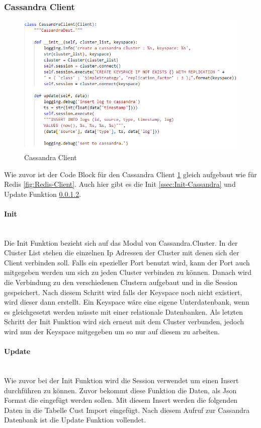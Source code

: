 \subsubsection{Cassandra Client}
\begin{figure}[H]
\centering
  \includegraphics[scale=0.65]{images/CassandraClient.PNG}
  \caption[Cassandra Client]{Cassandra Client}
  \label{fig:Cassandra-Client}
\end{figure}
Wie zuvor ist der Code Block für den Cassandra Client \ref{fig:Cassandra-Client} gleich aufgebaut wie  für Redis \ref{fig:Redis-Client}. Auch hier gibt es die Init \ref{ssec:Init-Cassandra} und Update Funktion \ref{ssec:Update-Cassandra}.
\paragraph{Init}\mbox{}\label{ssec:Init-Cassandra} \\
Die Init Funktion bezieht sich auf das Modul von Cassandra.Cluster. In der Cluster List stehen die einzelnen Ip Adressen der Cluster mit denen sich der Client verbinden soll. Falls ein spezieller Port benutzt wird, kann der Port auch mitgegeben werden um sich zu jeden Cluster verbinden zu können. Danach wird die Verbindung zu den verschiedenen Clustern aufgebaut und in die Session gespeichert. Nach diesem Schritt wird falls der Keyspace noch nicht existiert, wird dieser dann erstellt. Ein Keyspace wäre eine eigene Unterdatenbank, wenn es gleichgesetzt werden müsste mit einer relationale Datenbanken. Als letzten Schritt der Init Funktion wird sich erneut mit dem Cluster verbunden, jedoch wird nun der Keyspace mitgegeben um so nur auf diesem zu arbeiten.\\
\paragraph{Update}\label{ssec:Update-Cassandra}\mbox{} \\
Wie zuvor bei der Init Funktion wird die Session verwendet um einen Insert durchführen zu können. Zuvor bekommt diese Funktion die Daten, als Json Format die eingefügt werden sollen. Mit diesem Insert werden die folgenden Daten in die Tabelle Cust Import eingefügt. Nach diesem Aufruf zur Cassandra Datenbank ist die Update Funktion vollendet. 
